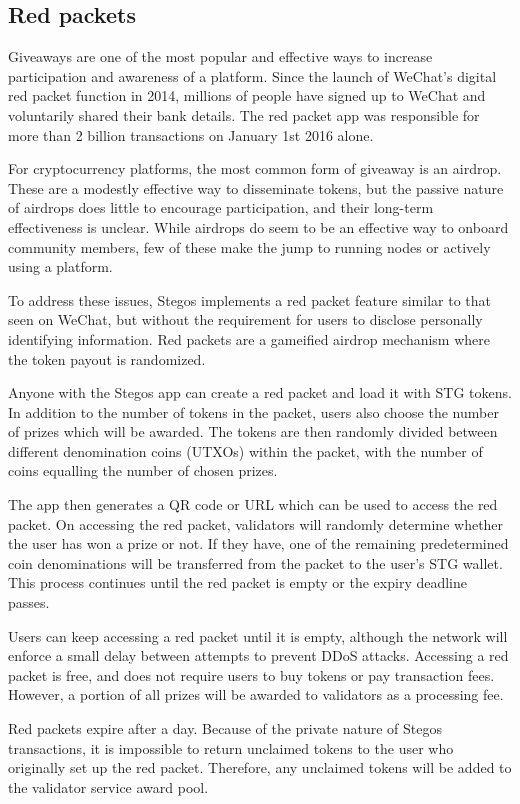 \documentclass[8pt,fleqn,openany]{book}
\begin{document}
\subsection{Red packets}\label{sec:red-packets}
Giveaways are one of the most popular and effective ways to increase participation and awareness of a platform. Since the launch of WeChat’s digital red packet function in 2014, millions of people have signed up to WeChat and voluntarily shared their bank details. The red packet app was responsible for more than 2 billion transactions on January 1st 2016 alone.

For cryptocurrency platforms, the most common form of giveaway is an airdrop. These are a modestly effective way to disseminate tokens, but the passive nature of airdrops does little to encourage participation, and their long-term effectiveness is unclear. While airdrops do seem to be an effective way to onboard community members, few of these make the jump to running nodes or actively using a platform.

To address these issues, Stegos implements a red packet feature similar to that seen on WeChat, but without the requirement for users to disclose personally identifying information. Red packets are a gameified airdrop mechanism where the token payout is randomized.

Anyone with the Stegos app can create a red packet and load it with STG tokens. In addition to the number of tokens in the packet, users also choose the number of prizes which will be awarded. The tokens are then randomly divided between different denomination coins (UTXOs) within the packet, with the number of coins equalling the number of chosen prizes. 

The app then generates a QR code or URL which can be used to access the red packet. On accessing the red packet, validators will randomly determine whether the user has won a prize or not. If they have, one of the remaining predetermined coin denominations will be transferred from the packet to the user’s STG wallet. This process continues until the red packet is empty or the expiry deadline passes.

Users can keep accessing a red packet until it is empty, although the network will enforce a small delay between attempts to prevent DDoS attacks. Accessing a red packet is free, and does not require users to buy tokens or pay transaction fees. However, a portion of all prizes will be awarded to validators as a processing fee.

Red packets expire after a day.  Because of the private nature of Stegos transactions, it is impossible to return unclaimed tokens to the user who originally set up the red packet. Therefore, any unclaimed tokens will be added to the validator service award pool.
\end{document}
